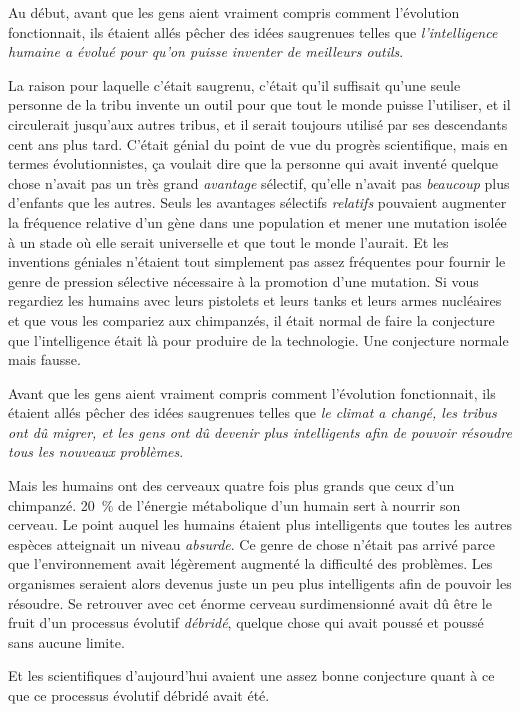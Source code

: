 Au début, avant que les gens aient vraiment compris comment l'évolution fonctionnait, ils étaient allés pêcher des idées saugrenues telles que \emph{l'intelligence humaine a évolué pour qu'on puisse inventer de meilleurs outils}.

La raison pour laquelle c'était saugrenu, c'était qu'il suffisait qu'une seule personne de la tribu invente un outil pour que tout le monde puisse l'utiliser, et il circulerait jusqu'aux autres tribus, et il serait toujours utilisé par ses descendants cent ans plus tard.
C'était génial du point de vue du progrès scientifique, mais en termes évolutionnistes, ça voulait dire que la personne qui avait inventé quelque chose n'avait pas un très grand \emph{avantage} sélectif, qu'elle n'avait pas \emph{beaucoup} plus d'enfants que les autres.
Seuls les avantages sélectifs \emph{relatifs} pouvaient augmenter la fréquence relative d'un gène dans une population et mener une mutation isolée à un stade où elle serait universelle et que tout le monde l'aurait.
Et les inventions géniales n'étaient tout simplement pas assez fréquentes pour fournir le genre de pression sélective nécessaire à la promotion d'une mutation.
Si vous regardiez les humains avec leurs pistolets et leurs tanks et leurs armes nucléaires et que vous les compariez aux chimpanzés, il était normal de faire la conjecture que l'intelligence était là pour produire de la technologie.
Une conjecture normale mais fausse.

Avant que les gens aient vraiment compris comment l'évolution fonctionnait, ils étaient allés pêcher des idées saugrenues telles que \emph{le climat a changé, les tribus ont dû migrer, et les gens ont dû devenir plus intelligents afin de pouvoir résoudre tous les nouveaux problèmes}.

Mais les humains ont des cerveaux quatre fois plus grands que ceux d'un chimpanzé.
20~\% de l'énergie métabolique d'un humain sert à nourrir son cerveau.
Le point auquel les humains étaient plus intelligents que toutes les autres espèces atteignait un niveau \emph{absurde}.
Ce genre de chose n'était pas arrivé parce que l'environnement avait légèrement augmenté la difficulté des problèmes.
Les organismes seraient alors devenus juste un peu plus intelligents afin de pouvoir les résoudre.
Se retrouver avec cet énorme cerveau surdimensionné avait dû être le fruit d'un processus évolutif \emph{débridé}, quelque chose qui avait poussé et poussé sans aucune limite.

Et les scientifiques d'aujourd'hui avaient une assez bonne conjecture quant à ce que ce processus évolutif débridé avait été.

